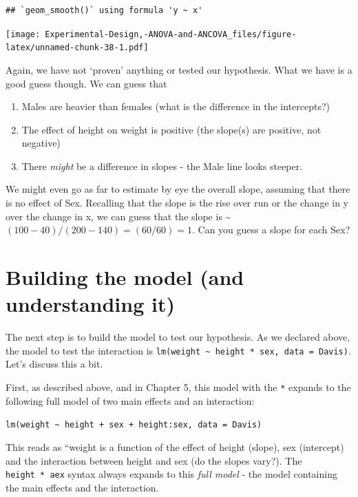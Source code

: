 \documentclass[
]{book}
\providecommand{\tightlist}{%
  \setlength{\itemsep}{0pt}\setlength{\parskip}{0pt}}
\begin{document}
\begin{verbatim}
## `geom_smooth()` using formula 'y ~ x'
\end{verbatim}

\texttt{[image: Experimental-Design,-ANOVA-and-ANCOVA\_files/figure-latex/unnamed-chunk-38-1.pdf]}

Again, we have not `proven' anything or tested our hypothesis. What we have is a good guess though. We can guess that

\begin{enumerate}
\def\labelenumi{\arabic{enumi}.}
\tightlist
\item
  Males are heavier than females (what is the difference in the intercepts?)
\item
  The effect of height on weight is positive (the slope(s) are positive, not negative)
\item
  There \emph{might} be a difference in slopes - the Male line looks steeper.
\end{enumerate}

We might even go as far to estimate by eye the overall slope, assuming that there is no effect of Sex. Recalling that the slope is the rise over run or the change in y over the change in x, we can guess that the slope is \textasciitilde{} \((100-40)/(200-140) = (60/60) = 1\). Can you guess a slope for each Sex?

\hypertarget{building-the-model-and-understanding-it}{%
\section{Building the model (and understanding it)}\label{building-the-model-and-understanding-it}}

The next step is to build the model to test our hypothesis. As we declared above, the model to test the interaction is \texttt{lm(weight\ \textasciitilde{}\ height\ *\ sex,\ data\ =\ Davis)}. Let's discuss this a bit.

First, as described above, and in Chapter 5, this model with the \texttt{*} expands to the following full model of two main effects and an interaction:

\texttt{lm(weight\ \textasciitilde{}\ height\ +\ sex\ +\ height:sex,\ data\ =\ Davis)}

This reads as ``weight is a function of the effect of height (slope), sex (intercept) and the interaction between height and sex (do the slopes vary?). The \texttt{height\ *\ aex} syntax always expands to this \emph{full model} - the model containing the main effects and the interaction.
\end{document}
